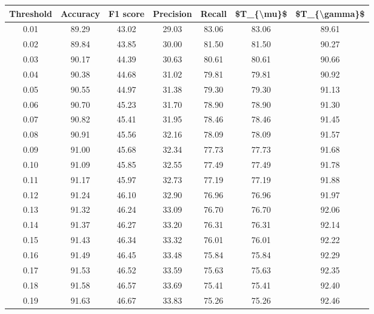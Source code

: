 \begin{tabular}{|c|c|c|c|c|c|c|}
\hline
 Threshold &  Accuracy &  F1 score &  Precision &  Recall &  \$T\_\{\textbackslash mu\}\$ &  \$T\_\{\textbackslash gamma\}\$ \\
\hline
      0.01 &     89.29 &     43.02 &      29.03 &   83.06 &      83.06 &         89.61 \\
      0.02 &     89.84 &     43.85 &      30.00 &   81.50 &      81.50 &         90.27 \\
      0.03 &     90.17 &     44.39 &      30.63 &   80.61 &      80.61 &         90.66 \\
      0.04 &     90.38 &     44.68 &      31.02 &   79.81 &      79.81 &         90.92 \\
      0.05 &     90.55 &     44.97 &      31.38 &   79.30 &      79.30 &         91.13 \\
      0.06 &     90.70 &     45.23 &      31.70 &   78.90 &      78.90 &         91.30 \\
      0.07 &     90.82 &     45.41 &      31.95 &   78.46 &      78.46 &         91.45 \\
      0.08 &     90.91 &     45.56 &      32.16 &   78.09 &      78.09 &         91.57 \\
      0.09 &     91.00 &     45.68 &      32.34 &   77.73 &      77.73 &         91.68 \\
      0.10 &     91.09 &     45.85 &      32.55 &   77.49 &      77.49 &         91.78 \\
      0.11 &     91.17 &     45.97 &      32.73 &   77.19 &      77.19 &         91.88 \\
      0.12 &     91.24 &     46.10 &      32.90 &   76.96 &      76.96 &         91.97 \\
      0.13 &     91.32 &     46.24 &      33.09 &   76.70 &      76.70 &         92.06 \\
      0.14 &     91.37 &     46.27 &      33.20 &   76.31 &      76.31 &         92.14 \\
      0.15 &     91.43 &     46.34 &      33.32 &   76.01 &      76.01 &         92.22 \\
      0.16 &     91.49 &     46.45 &      33.48 &   75.84 &      75.84 &         92.29 \\
      0.17 &     91.53 &     46.52 &      33.59 &   75.63 &      75.63 &         92.35 \\
      0.18 &     91.58 &     46.57 &      33.69 &   75.41 &      75.41 &         92.40 \\
      0.19 &     91.63 &     46.67 &      33.83 &   75.26 &      75.26 &         92.46 \\

\end{tabular}
